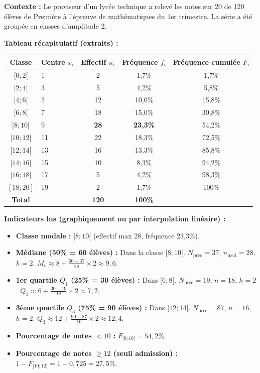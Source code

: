 \documentclass[11pt]{article}
\begin{document}
\begin{exoresolu}
\textbf{Contexte :} Le proviseur d'un lycée technique a relevé les notes sur 20 de 120 élèves de Première à l'épreuve de mathématiques du 1er trimestre. La série a été groupée en classes d'amplitude 2.

\textbf{Tableau récapitulatif (extraits) :}
\begin{center}
\begin{tabularx}{\linewidth}{|c|X|c|c|c|}\hline
Classe & Centre $x_i$ & Effectif $n_i$ & Fréquence $f_i$ & Fréquence cumulée $F_i$ \\ \hline
$[0 ; 2[$ & 1 & 2 & 1,7\% & 1,7\% \\
$[2 ; 4[$ & 3 & 5 & 4,2\% & 5,8\% \\
$[4 ; 6[$ & 5 & 12 & 10,0\% & 15,8\% \\
$[6 ; 8[$ & 7 & 18 & 15,0\% & 30,8\% \\
$[8 ; 10[$ & 9 & \textbf{28} & \textbf{23,3\%} & 54,2\% \\
$[10 ; 12[$ & 11 & 22 & 18,3\% & 72,5\% \\
$[12 ; 14[$ & 13 & 16 & 13,3\% & 85,8\% \\
$[14 ; 16[$ & 15 & 10 & 8,3\% & 94,2\% \\
$[16 ; 18[$ & 17 & 5 & 4,2\% & 98,3\% \\
$[18 ; 20]$ & 19 & 2 & 1,7\% & 100\% \\ \hline
\textbf{Total} & & \textbf{120} & \textbf{100\%} & \\ \hline
\end{tabularx}
\end{center}

\textbf{Indicateurs lus (graphiquement ou par interpolation linéaire) :}
\begin{itemize}
    \item \textbf{Classe modale :} $[8 ; 10[$ (effectif max 28, fréquence 23,3\%).
    \item \textbf{Médiane (50\% = 60 élèves) :} Dans la classe $[8 ; 10[$. $N_{\text{prec}}=37$, $n_{\text{med}}=28$, $h=2$.
    $M_e \approx 8 + \frac{60 - 37}{28} \times 2 \approx 9,6$.
    \item \textbf{1er quartile $Q_1$ (25\% = 30 élèves) :} Dans $[6 ; 8[$. $N_{\text{prec}}=19$, $n=18$, $h=2$.
    $Q_1 \approx 6 + \frac{30 - 19}{18} \times 2 \approx 7,2$.
    \item \textbf{3ème quartile $Q_3$ (75\% = 90 élèves) :} Dans $[12 ; 14[$. $N_{\text{prec}}=87$, $n=16$, $h=2$.
    $Q_3 \approx 12 + \frac{90 - 87}{16} \times 2 \approx 12,4$.
    \item \textbf{Pourcentage de notes $< 10$ :} $F_{[8;10[} = 54,2\%$.
    \item \textbf{Pourcentage de notes $\ge 12$ (seuil admission) :} $1 - F_{[10;12[} = 1 - 0,725 = 27,5\%$.
\end{itemize}


\end{exoresolu}
\end{document}
